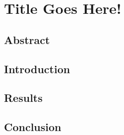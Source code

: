 \documentclass[dissertation.tex]{subfiles}
\begin{document}
\chapter{Title Goes Here!} \label{chapter:proj1}
\pagebreak

\section{Abstract}


\section{Introduction}


\section{Results}


\section{Conclusion}
\end{document}
